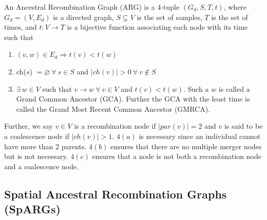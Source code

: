\begin{definition} An Ancestral Recombination Graph (ARG) is a 4-tuple $(G_d, S, T, t)$, where $G_d = (V, E_d)$ is a directed graph, $S \subsetneq V$ is the set of samples, $T$ is the set of times, and $t: V \rightarrow T$ is a bijective function associating each node with its time such that 
\begin{enumerate}
    \item $(v,w) \in E_d \Rightarrow t(v) < t(w)$ 
    \item ch($s$) $= \varnothing \ \forall \ s \in S$ and $|ch(v)|>0 \ \forall \ v \notin S$
    \item $\exists \ w \in V $ such that $v \rightarrow w \ \forall \ v \in V$ and $t(v) < t(w)$. Such a $w$ is called a Grand Common Ancestor (GCA). Further the GCA with the least time is called the Grand Most Recent Common Ancestor (GMRCA). 
\end{enumerate}
Further, we say $v \in V$ is a recombination node if $|par(v)| = 2$ and $v$ is said to be a coalescence node if $|ch(v)| > 1$. $4(a)$ is necessary since an individual cannot have more than 2 parents. $4(b)$ ensures that there are no multiple merger nodes but is not necessary. $4(c)$ ensures that a node is not both a recombination node and a coalescence node. 
\end{definition}

\subsection{Spatial Ancestral Recombination Graphs (SpARGs)}

